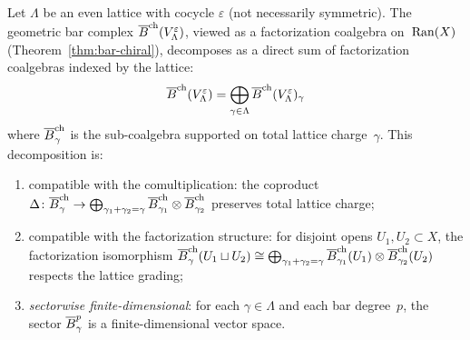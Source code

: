 \begin{proposition}
\label{prop:lattice:factorization-decomposition}
Let $\Lambda$ be an even lattice with cocycle $\varepsilon$
\textup{(}not necessarily symmetric\textup{)}.  The geometric bar
complex $\overline{B}^{\mathrm{ch}}(V_\Lambda^\varepsilon)$, viewed as
a factorization coalgebra on~$\operatorname{Ran}(X)$
\textup{(}Theorem~\textup{\ref{thm:bar-chiral})}, decomposes as a
direct sum of factorization coalgebras indexed by the lattice:
\begin{equation}\label{eq:lattice:fact-decomposition}
\overline{B}^{\mathrm{ch}}(V_\Lambda^\varepsilon)
= \bigoplus_{\gamma \in \Lambda}
  \overline{B}^{\mathrm{ch}}(V_\Lambda^\varepsilon)_\gamma
\end{equation}
where $\overline{B}^{\mathrm{ch}}_\gamma$ is the sub-coalgebra supported on
total lattice charge~$\gamma$.  This decomposition is:
\begin{enumerate}[label=(\roman*)]
\item compatible with the comultiplication: the coproduct
  $\Delta\colon \overline{B}^{\mathrm{ch}}_\gamma \to
  \bigoplus_{\gamma_1+\gamma_2=\gamma}
  \overline{B}^{\mathrm{ch}}_{\gamma_1} \otimes
  \overline{B}^{\mathrm{ch}}_{\gamma_2}$
  preserves total lattice charge;
\item compatible with the factorization structure: for disjoint opens
  $U_1, U_2 \subset X$, the factorization isomorphism
  $\overline{B}^{\mathrm{ch}}_\gamma(U_1 \sqcup U_2) \cong
  \bigoplus_{\gamma_1+\gamma_2=\gamma}
  \overline{B}^{\mathrm{ch}}_{\gamma_1}(U_1)
  \otimes \overline{B}^{\mathrm{ch}}_{\gamma_2}(U_2)$
  respects the lattice grading;
\item \emph{sectorwise finite-dimensional}: for each
  $\gamma \in \Lambda$ and each bar degree~$p$, the sector
  $\overline{B}^p_\gamma$ is a finite-dimensional vector space.
\end{enumerate}
\end{proposition}

